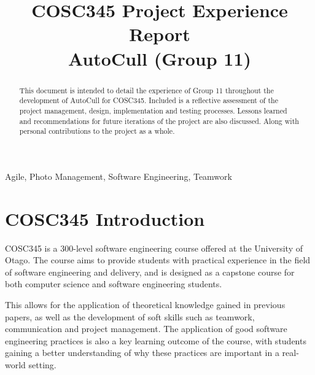 \documentclass[conference]{IEEEtran}
\begin{document}
\title{COSC345 Project Experience Report\\
{\footnotesize AutoCull (Group 11)}
}

\author{
\and
{}
\and
{}
\and
{}
\and
{}
}

\maketitle

\begin{abstract}
This document is intended to detail the experience of Group 11 throughout the development of AutoCull for COSC345. Included is a reflective assessment of the project management, design, implementation and testing processes. Lessons learned and recommendations for future iterations of the project are also discussed. Along with personal contributions to the project as a whole.

\end{abstract}

\begin{IEEEkeywords}
Agile, Photo Management, Software Engineering, Teamwork
\end{IEEEkeywords}

\section{COSC345 Introduction}
COSC345 is a 300-level software engineering course offered at the University of Otago. The course aims to provide students with practical experience in the field of software engineering and delivery, and is designed as a capstone course for both computer science and software engineering students.

This allows for the application of theoretical knowledge gained in previous papers, as well as the development of soft skills such as teamwork, communication and project management. The application of good software engineering practices is also a key learning outcome of the course, with students gaining a better understanding of why these practices are important in a real-world setting.
\end{document}
